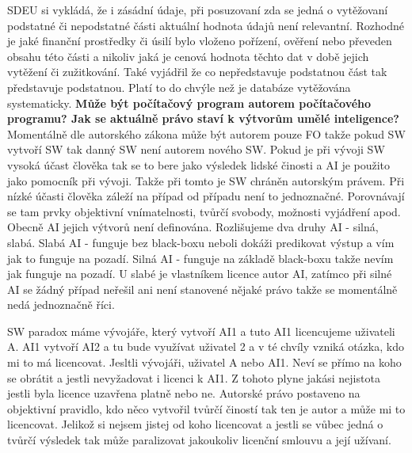 \documentclass[12pt,a4paper,czech]{report}
\newcommand{\nadpis}[1]{\noindent\textbf{\Large{#1}}\normalsize}
\begin{document}
SDEU si vykládá, že i zásádní údaje, při posuzovaní zda se jedná o vytěžovaní podstatné či nepodstatné části aktuální hodnota údajů není relevantní. Rozhodné je jaké finanční prostředky či úsilí bylo vloženo pořízení, ověření nebo převeden obsahu této části a nikoliv jaká je cenová hodnota těchto dat v době jejich vytěžení či zužitkování. Také vyjádřil že co nepředstavuje podstatnou část tak představuje podstatnou. Platí to do chvýle než je databáze vytěžována systematicky.
\newline
\newline
\nadpis{Může být počítačový program autorem počítačového programu? Jak se aktuálně právo staví k výtvorům umělé inteligence?}
\newline
\newline
Momentálně dle autorského zákona může být autorem pouze FO takže pokud SW vytvoří SW tak danný SW není autorem nového SW. Pokud je při vývoji SW vysoká účast člověka tak se to bere jako výsledek lidské činosti a AI je použito jako pomocník při vývoji. Takže při tomto je SW chráněn autorským právem. Při nízké účasti člověka záleží na případ od případu není to jednoznačné. Porovnávají se tam prvky objektivní vnímatelnosti, tvůrčí svobody, možnosti vyjádření apod. Obecně AI jejich výtvorů není definována. Rozlišujeme dva druhy AI - silná, slabá. Slabá AI - funguje bez black-boxu neboli dokáži predikovat výstup a vím jak to funguje na pozadí. Silná AI - funguje na základě black-boxu takže nevím jak funguje na pozadí. U slabé je vlastníkem licence autor AI, zatímco při silné AI se žádný případ neřešil ani není stanovené nějaké právo takže se momentálně nedá jednoznačně říci.

SW paradox máme vývojáře, který vytvoří AI1 a tuto AI1 licencujeme uživateli A. AI1 vytvoří AI2 a tu bude využívat uživatel 2 a v té chvíly vzniká otázka, kdo mi to má licencovat. Jesltli vývojáři, uživatel A nebo AI1. Neví se přímo na koho se obrátit a jestli nevyžadovat i licenci k AI1. Z tohoto plyne jakási nejistota jestli byla licence uzavřena platně nebo ne. Autorské právo postaveno na objektivní pravidlo, kdo něco vytvořil tvůrčí čiností tak ten je autor a může mi to licencovat. Jelikož si nejsem jistej od koho licencovat a jestli se vůbec jedná o tvůrčí výsledek tak může paralizovat jakoukoliv licenční smlouvu a její užívaní.
\end{document}
